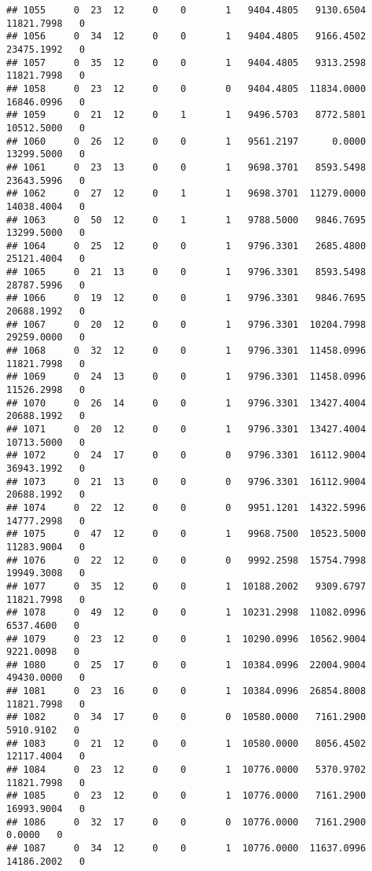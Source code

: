 \documentclass[
]{article}
\begin{document}
\begin{enumerate}
\begin{verbatim}
## 1055     0  23  12     0    0       1   9404.4805   9130.6504  11821.7998   0
## 1056     0  34  12     0    0       1   9404.4805   9166.4502  23475.1992   0
## 1057     0  35  12     0    0       1   9404.4805   9313.2598  11821.7998   0
## 1058     0  23  12     0    0       0   9404.4805  11834.0000  16846.0996   0
## 1059     0  21  12     0    1       1   9496.5703   8772.5801  10512.5000   0
## 1060     0  26  12     0    0       1   9561.2197      0.0000  13299.5000   0
## 1061     0  23  13     0    0       1   9698.3701   8593.5498  23643.5996   0
## 1062     0  27  12     0    1       1   9698.3701  11279.0000  14038.4004   0
## 1063     0  50  12     0    1       1   9788.5000   9846.7695  13299.5000   0
## 1064     0  25  12     0    0       1   9796.3301   2685.4800  25121.4004   0
## 1065     0  21  13     0    0       1   9796.3301   8593.5498  28787.5996   0
## 1066     0  19  12     0    0       1   9796.3301   9846.7695  20688.1992   0
## 1067     0  20  12     0    0       1   9796.3301  10204.7998  29259.0000   0
## 1068     0  32  12     0    0       1   9796.3301  11458.0996  11821.7998   0
## 1069     0  24  13     0    0       1   9796.3301  11458.0996  11526.2998   0
## 1070     0  26  14     0    0       1   9796.3301  13427.4004  20688.1992   0
## 1071     0  20  12     0    0       1   9796.3301  13427.4004  10713.5000   0
## 1072     0  24  17     0    0       0   9796.3301  16112.9004  36943.1992   0
## 1073     0  21  13     0    0       0   9796.3301  16112.9004  20688.1992   0
## 1074     0  22  12     0    0       0   9951.1201  14322.5996  14777.2998   0
## 1075     0  47  12     0    0       1   9968.7500  10523.5000  11283.9004   0
## 1076     0  22  12     0    0       0   9992.2598  15754.7998  19949.3008   0
## 1077     0  35  12     0    0       1  10188.2002   9309.6797  11821.7998   0
## 1078     0  49  12     0    0       1  10231.2998  11082.0996   6537.4600   0
## 1079     0  23  12     0    0       1  10290.0996  10562.9004   9221.0098   0
## 1080     0  25  17     0    0       1  10384.0996  22004.9004  49430.0000   0
## 1081     0  23  16     0    0       1  10384.0996  26854.8008  11821.7998   0
## 1082     0  34  17     0    0       0  10580.0000   7161.2900   5910.9102   0
## 1083     0  21  12     0    0       1  10580.0000   8056.4502  12117.4004   0
## 1084     0  23  12     0    0       1  10776.0000   5370.9702  11821.7998   0
## 1085     0  23  12     0    0       1  10776.0000   7161.2900  16993.9004   0
## 1086     0  32  17     0    0       0  10776.0000   7161.2900      0.0000   0
## 1087     0  34  12     0    0       1  10776.0000  11637.0996  14186.2002   0

\end{verbatim}
\end{enumerate}
\end{document}
